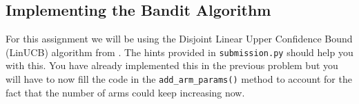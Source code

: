 \subsection*{Implementing the Bandit Algorithm}

\item {}

For this assignment we will be using the Disjoint Linear Upper Confidence Bound (LinUCB) algorithm from \cite{li2010contextual}. 
The hints provided in \texttt{submission.py} should help you with this.
You have already implemented this in the previous problem but you will have to now fill the code in the 
\texttt{add\_arm\_params()} method to account for the fact that the number of arms could keep increasing now.

